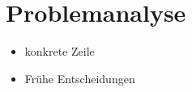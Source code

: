 \chapter{Problemanalyse}
\label{cha:problemanalyse}

\begin{itemize}
\item konkrete Zeile
\item Frühe Entscheidungen
\end{itemize}
